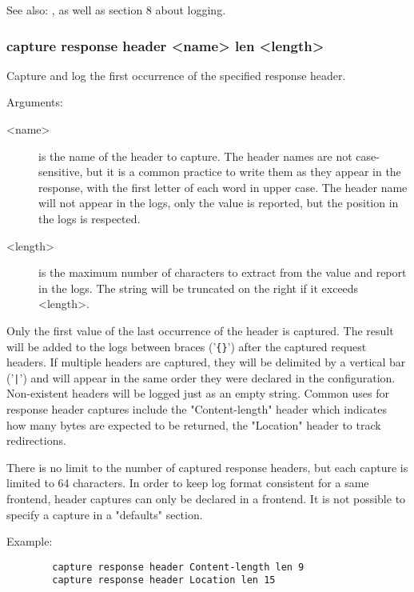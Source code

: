   See also: ,  as well as section 8
             about logging.

\subsubsection[capture response header]{capture response header <name> len <length>}
  Capture and log the first occurrence of the specified response header.
  

  Arguments:
  \begin{description}
  \item[<name>]    is the name of the header to capture. The header names are not
              case-sensitive, but it is a common practice to write them as they
              appear in the response, with the first letter of each word in
              upper case. The header name will not appear in the logs, only the
              value is reported, but the position in the logs is respected.

  \item[<length>]  is the maximum number of characters to extract from the value and
              report in the logs. The string will be truncated on the right if
              it exceeds <length>.
  \end{description}

  Only the first value of the last occurrence of the header is captured. The
  result will be added to the logs between braces ('\verb|{}|') after the captured
  request headers. If multiple headers are captured, they will be delimited by
  a vertical bar ('\verb:|:') and will appear in the same order they were declared in
  the configuration. Non-existent headers will be logged just as an empty
  string. Common uses for response header captures include the "Content-length"
  header which indicates how many bytes are expected to be returned, the
  "Location" header to track redirections.

  There is no limit to the number of captured response headers, but each
  capture is limited to 64 characters. In order to keep log format consistent
  for a same frontend, header captures can only be declared in a frontend. It
  is not possible to specify a capture in a "defaults" section.

  Example:
  \begin{verbatim}
        capture response header Content-length len 9
        capture response header Location len 15
  \end{verbatim}

